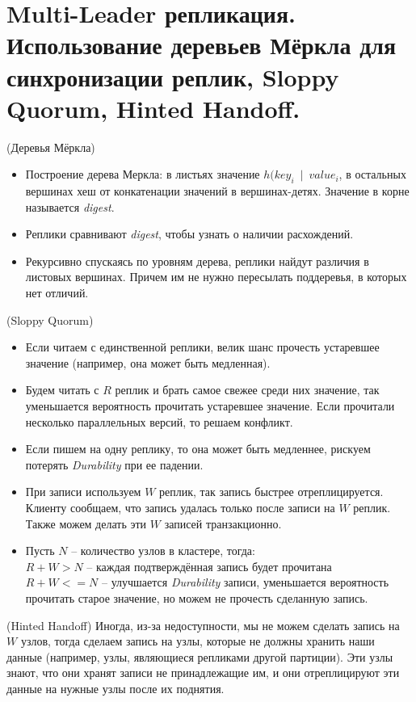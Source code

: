 \section{Multi-Leader репликация. Использование деревьев Мёркла для синхронизации реплик, Sloppy Quorum, Hinted Handoff.}

\begin{algorithm}(Деревья Мёркла)
\begin{itemize}
    \item Построение дерева Меркла: в листьях значение $h(key_i ~\mid~ value_i$,
        в остальных вершинах хеш от конкатенации значений в вершинах-детях.
        Значение в корне называется \textit{digest}.
    \item Реплики сравнивают \textit{digest}, чтобы узнать о наличии расхождений.
    \item Рекурсивно спускаясь по уровням дерева, реплики найдут различия
        в листовых вершинах. Причем им не нужно пересылать поддеревья,
        в которых нет отличий.
\end{itemize}
\end{algorithm}

\begin{algorithm}(Sloppy Quorum)
  \begin{itemize}
    \item Если читаем с единственной реплики, велик шанс прочесть устаревшее значение
        (например, она может быть медленная).
    \item Будем читать с $R$ реплик и брать самое свежее среди них значение,
        так уменьшается вероятность прочитать устаревшее значение.
        Если прочитали несколько параллельных версий, то решаем конфликт.
    \item Если пишем на одну реплику, то она может быть медленнее,
        рискуем потерять \textit{Durability} при ее падении.
    \item При записи используем $W$ реплик, так запись быстрее отреплицируется.
        Клиенту сообщаем, что запись удалась только после записи на $W$ реплик.
        Также можем делать эти $W$ записей транзакционно.
    \item Пусть $N$ -- количество узлов в кластере, тогда: \\
        $R + W > N$ -- каждая подтверждённая запись будет прочитана \\
        $R + W <= N$ -- улучшается \textit{Durability} записи, уменьшается
        вероятность прочитать старое значение, но можем не прочесть сделанную запись.
  \end{itemize}
\end{algorithm}

\begin{algorithm}(Hinted Handoff)
    Иногда, из-за недоступности, мы не можем сделать запись на $W$ узлов,
    тогда сделаем запись на узлы, которые не должны хранить наши данные
    (например, узлы, являющиеся репликами другой партиции).
    Эти узлы знают, что они хранят записи не принадлежащие им,
    и они отреплицируют эти данные на нужные узлы после их поднятия.
\end{algorithm}
